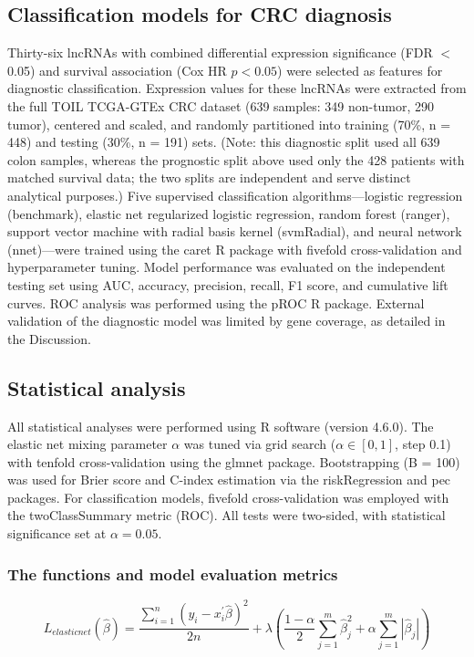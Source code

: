 \documentclass[fleqn,10pt]{wlscirep}
\begin{document}
\subsection*{Classification models for CRC diagnosis}
Thirty-six lncRNAs with combined differential expression significance (FDR $<$ 0.05) and survival association (Cox HR $p < 0.05$) were selected as features for diagnostic classification. Expression values for these lncRNAs were extracted from the full TOIL TCGA-GTEx CRC dataset (639 samples: 349 non-tumor, 290 tumor), centered and scaled, and randomly partitioned into training (70\%, n = 448) and testing (30\%, n = 191) sets. (Note: this diagnostic split used all 639 colon samples, whereas the prognostic split above used only the 428 patients with matched survival data; the two splits are independent and serve distinct analytical purposes.) Five supervised classification algorithms—logistic regression (benchmark), elastic net regularized logistic regression, random forest (ranger), support vector machine with radial basis kernel (svmRadial), and neural network (nnet)—were trained using the caret R package\cite{RN16} with fivefold cross-validation and hyperparameter tuning. Model performance was evaluated on the independent testing set using AUC, accuracy, precision, recall, F1 score, and cumulative lift curves. ROC analysis was performed using the pROC R package\cite{RN34}. External validation of the diagnostic model was limited by gene coverage, as detailed in the Discussion.
\subsection*{Statistical analysis}
All statistical analyses were performed using R software (version 4.6.0). The elastic net mixing parameter $\alpha$ was tuned via grid search ($\alpha \in [0, 1]$, step 0.1) with tenfold cross-validation using the glmnet package. Bootstrapping (B = 100) was used for Brier score and C-index estimation via the riskRegression and pec packages. For classification models, fivefold cross-validation was employed with the twoClassSummary metric (ROC). All tests were two-sided, with statistical significance set at $\alpha = 0.05$.

\subsubsection*{The functions and model evaluation metrics}
\begin{equation}\label{Elasticnet}
L_{elasticnet}(\hat{\beta})=\frac{\sum_{i=1}^{n}\left(y_{i}-x_{i}^{\prime} \hat{\beta}\right)^{2}}{2 n}+\lambda\left(\frac{1-\alpha}{2} \sum_{j=1}^{m} \hat{\beta}_{j}^{2}+\alpha \sum_{j=1}^{m}\left|\hat{\beta}_{j}\right|\right)
\end{equation}
\end{document}
